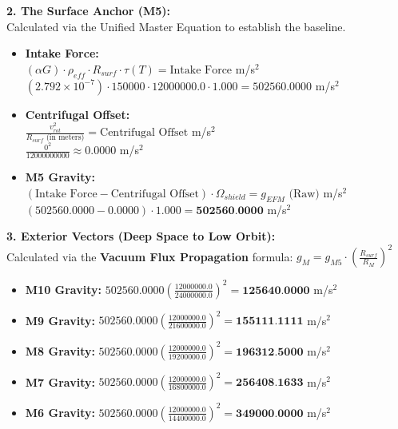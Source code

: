 \documentclass[11pt, a4paper]{article}
\begin{document}
  \vspace{1.0em}
  \noindent \textbf{2. The Surface Anchor (M5):} \\
  \hspace*{1em} Calculated via the Unified Master Equation to establish the baseline.
  \begin{itemize}
    \item \textbf{Intake Force:} \\[0.5em]
    \hspace*{2em} $(\alpha G) \cdot \rho_{eff} \cdot R_{surf} \cdot \tau(T) = \text{Intake Force}$ m/s$^2$ \\[1em]
    \hspace*{2em} $(2.792 \times 10^{-7}) \cdot 150000 \cdot 12000000.0 \cdot 1.000 = 502560.0000$ m/s$^2$
    
    \item \textbf{Centrifugal Offset:} \\[0.5em]
    \hspace*{2em} $\frac{v_{rot}^2}{R_{surf} \text{ (in meters)}} = \text{Centrifugal Offset}$ m/s$^2$ \\[1em]
    \hspace*{2em} $\frac{0^2}{12000000000} \approx 0.0000$ m/s$^2$
    
    \item \textbf{M5 Gravity:} \\[0.5em]
    \hspace*{2em} $(\text{Intake Force} - \text{Centrifugal Offset}) \cdot \Omega_{shield} = g_{EFM} \text{ (Raw)}$ m/s$^2$ \\[1em]
    \hspace*{2em} $(502560.0000 - 0.0000) \cdot 1.000 = \textbf{502560.0000}$ m/s$^2$
  \end{itemize}

  \clearpage
  \noindent \textbf{3. Exterior Vectors (Deep Space to Low Orbit):} \\
  \hspace*{1em} Calculated via the \textbf{Vacuum Flux Propagation} formula: $g_M = g_{M5} \cdot \left( \frac{R_{surf}}{R_M} \right)^2$
  \begin{itemize}
    \item \textbf{M10 Gravity:} $502560.0000 \left( \frac{12000000.0}{24000000.0} \right)^2 = \textbf{125640.0000}$ m/s$^2$
    \item \textbf{M9 Gravity:} $502560.0000 \left( \frac{12000000.0}{21600000.0} \right)^2 = \textbf{155111.1111}$ m/s$^2$
    \item \textbf{M8 Gravity:} $502560.0000 \left( \frac{12000000.0}{19200000.0} \right)^2 = \textbf{196312.5000}$ m/s$^2$
    \item \textbf{M7 Gravity:} $502560.0000 \left( \frac{12000000.0}{16800000.0} \right)^2 = \textbf{256408.1633}$ m/s$^2$
    \item \textbf{M6 Gravity:} $502560.0000 \left( \frac{12000000.0}{14400000.0} \right)^2 = \textbf{349000.0000}$ m/s$^2$
  \end{itemize}
\end{document}
